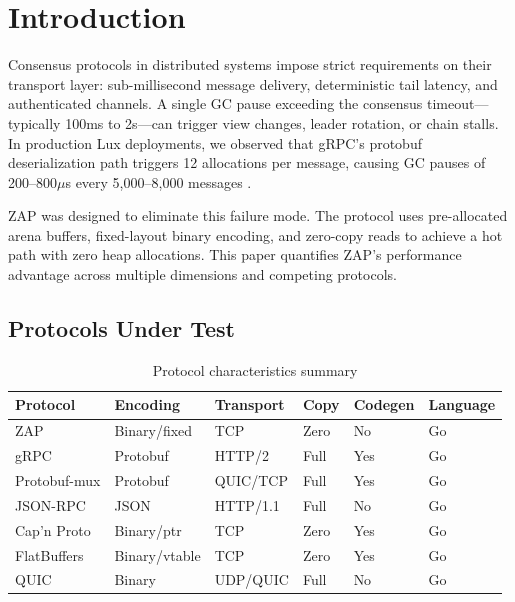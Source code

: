 \section{Introduction}


Consensus protocols in distributed systems impose strict requirements on their transport layer: sub-millisecond message delivery, deterministic tail latency, and authenticated channels. A single GC pause exceeding the consensus timeout---typically 100ms to 2s---can trigger view changes, leader rotation, or chain stalls. In production Lux deployments, we observed that gRPC's protobuf deserialization path triggers 12 allocations per message, causing GC pauses of 200--800$\mu$s every 5,000--8,000 messages \cite{zapwire}.

ZAP was designed to eliminate this failure mode. The protocol uses pre-allocated arena buffers, fixed-layout binary encoding, and zero-copy reads to achieve a hot path with zero heap allocations. This paper quantifies ZAP's performance advantage across multiple dimensions and competing protocols.

\subsection{Protocols Under Test}

\begin{table}[h]
\centering
\caption{Protocol characteristics summary}
\label{tab:protocols}
\begin{tabular}{llllll}
\toprule
\textbf{Protocol} & \textbf{Encoding} & \textbf{Transport} & \textbf{Copy} & \textbf{Codegen} & \textbf{Language} \\
\midrule
ZAP & Binary/fixed & TCP & Zero & No & Go \\
gRPC & Protobuf & HTTP/2 & Full & Yes & Go \\
Protobuf-mux & Protobuf & QUIC/TCP & Full & Yes & Go \\
JSON-RPC & JSON & HTTP/1.1 & Full & No & Go \\
Cap'n Proto & Binary/ptr & TCP & Zero & Yes & Go \\
FlatBuffers & Binary/vtable & TCP & Zero & Yes & Go \\
QUIC & Binary & UDP/QUIC & Full & No & Go \\
\bottomrule
\end{tabular}
\end{table}

